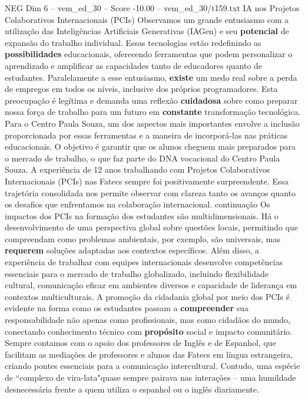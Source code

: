 \begin{textsample}{NEG Dim 6 – vem\_ed\_30 – Score -10.00 – vem\_ed\_30/t159.txt}  \label{ex:f6_neg_067}
IA nos Projetos Colaborativos Internacionais (PCIs) Observamos um grande entusiasmo com a utilização das Inteligências Artificiais Generativas (IAGen) e seu \textbf{potencial} de expansão do trabalho individual.
Essas tecnologias estão redefinindo as \textbf{possibilidades} educacionais, oferecendo ferramentas que podem personalizar o aprendizado e amplificar as capacidades tanto de educadores quanto de estudantes.
Paralelamente a esse entusiasmo, \textbf{existe} um medo real sobre a perda de empregos em todos os níveis, inclusive dos próprios programadores.
Esta preocupação é legítima e demanda uma reflexão \textbf{cuidadosa} sobre como preparar nossa força de trabalho para um futuro em \textbf{constante} transformação tecnológica.
Para o Centro Paula Souza, um dos aspectos mais importantes envolve a inclusão proporcionada por essas ferramentas e a maneira de incorporá-las nas práticas educacionais.
O objetivo é garantir que os alunos cheguem mais preparados para o mercado de trabalho, o que faz parte do DNA vocacional do Centro Paula Souza.
A experiência de 12 anos trabalhando com Projetos Colaborativos Internacionais (PCIs) nas Fatecs sempre foi positivamente surpreendente.
Essa trajetória consolidada nos permite observar com clareza tanto os avanços quanto os desafios que enfrentamos na colaboração internacional. continuação Os impactos dos PCIs na formação dos estudantes são multidimensionais.
Há o desenvolvimento de uma perspectiva global sobre questões locais, permitindo que compreendam como problemas ambientais, por exemplo, são universais, mas \textbf{requerem} soluções adaptadas aos contextos específicos.
Além disso, a experiência de trabalhar com equipes internacionais desenvolve competências essenciais para o mercado de trabalho globalizado, incluindo flexibilidade cultural, comunicação eficaz em ambientes diversos e capacidade de liderança em contextos multiculturais.
A promoção da cidadania global por meio dos PCIs é evidente na forma como os estudantes passam a \textbf{compreender} sua responsabilidade não apenas como profissionais, mas como cidadãos do mundo, conectando conhecimento técnico com \textbf{propósito} social e impacto comunitário.
Sempre contamos com o apoio dos professores de Inglês e de Espanhol, que facilitam as mediações de professores e alunos das Fatecs em língua estrangeira, criando pontes essenciais para a comunicação intercultural.
Contudo, uma espécie de “complexo de vira-lata"quase sempre pairava nas interações – uma humildade desnecessária frente a quem utiliza o espanhol ou o inglês diariamente.

\end{textsample}
